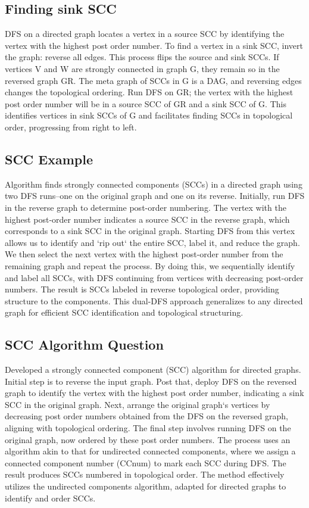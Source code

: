 \subsection*{Finding sink SCC}
DFS on a directed graph locates a vertex in a source SCC by identifying the vertex with the highest post order number.
To find a vertex in a sink SCC, invert the graph: reverse all edges.
This process flips the source and sink SCCs.
If vertices V and W are strongly connected in graph G, they remain so in the reversed graph GR\@.
The meta graph of SCCs in G is a DAG, and reversing edges changes the topological ordering.
Run DFS on GR; the vertex with the highest post order number will be in a source SCC of GR and a sink SCC of G\@.
This identifies vertices in sink SCCs of G and facilitates finding SCCs in topological order, progressing from right to left.

\subsection*{SCC Example}
Algorithm finds strongly connected components (SCCs) in a directed graph using two DFS runs--one on the original graph and one on its reverse.
Initially, run DFS in the reverse graph to determine post-order numbering.
The vertex with the highest post-order number indicates a source SCC in the reverse graph, which corresponds to a sink SCC in the original graph.
Starting DFS from this vertex allows us to identify and `rip out` the entire SCC, label it, and reduce the graph.
We then select the next vertex with the highest post-order number from the remaining graph and repeat the process.
By doing this, we sequentially identify and label all SCCs, with DFS continuing from vertices with decreasing post-order numbers.
The result is SCCs labeled in reverse topological order, providing structure to the components.
This dual-DFS approach generalizes to any directed graph for efficient SCC identification and topological structuring.

\subsection*{SCC Algorithm Question}
Developed a strongly connected component (SCC) algorithm for directed graphs.
Initial step is to reverse the input graph.
Post that, deploy DFS on the reversed graph to identify the vertex with the highest post order number, indicating a sink SCC in the original graph.
Next, arrange the original graph`s vertices by decreasing post order numbers obtained from the DFS on the reversed graph, aligning with topological ordering.
The final step involves running DFS on the original graph, now ordered by these post order numbers.
The process uses an algorithm akin to that for undirected connected components, where we assign a connected component number (CCnum) to mark each SCC during DFS\@.
The result produces SCCs numbered in topological order.
The method effectively utilizes the undirected components algorithm, adapted for directed graphs to identify and order SCCs.

